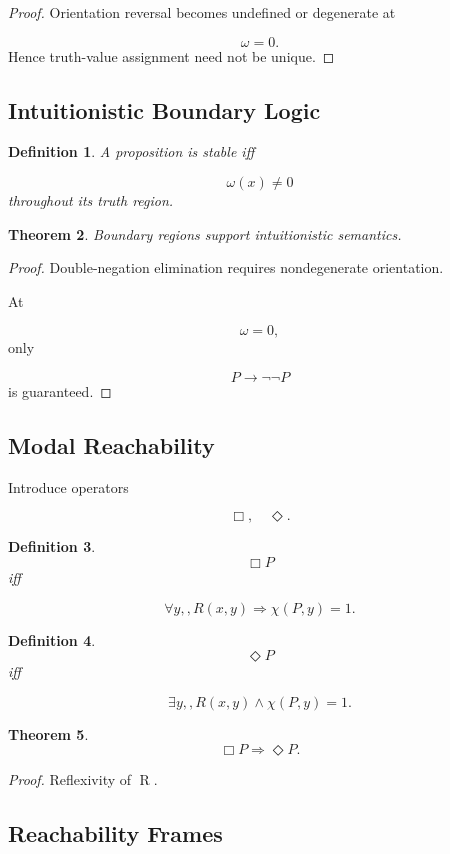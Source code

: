 \documentclass[12pt]{article}
\newtheorem{theorem}{Theorem}[section]
\newtheorem{definition}[theorem]{Definition}
\theoremstyle{remark}
\begin{document}
\begin{proof}
Orientation reversal becomes undefined or degenerate at

\[
\omega=0.
\]
Hence truth-value assignment need not be unique.
\end{proof}

\subsection{Intuitionistic Boundary Logic}

\begin{definition}
A proposition is stable iff

\[
\omega(x)\neq0
\]
throughout its truth region.
\]
\end{definition}

\begin{theorem}
Boundary regions support intuitionistic semantics.
\end{theorem}

\begin{proof}
Double-negation elimination requires nondegenerate orientation.

At

\[
\omega=0,
\]
only

\[
P\rightarrow\neg\neg P
\]
is guaranteed.
\end{proof}

\subsection{Modal Reachability}

Introduce operators

\[
\Box,
\quad
\Diamond.
\]
\begin{definition}
\[
\Box P
\]
iff

\[
\forall y,
,
R(x,y)
\Rightarrow
\chi(P,y)=1.
\]
\end{definition}
\begin{definition}
\[
\Diamond P
\]
iff

\[
\exists y,
,
R(x,y)
\wedge
\chi(P,y)=1.
\]
\end{definition}
\begin{theorem}
\[
\Box P
\Rightarrow
\Diamond P.
\]
\end{theorem}
\begin{proof}
Reflexivity of R.
\end{proof}

\subsection{Reachability Frames}
\end{document}
